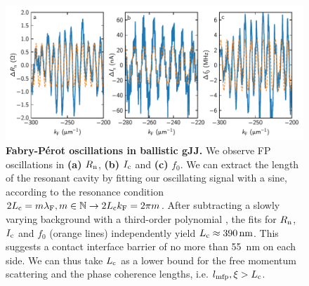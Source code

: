 \documentclass[preprint,
  onecolumn,
  notitlepage,
  amsmath,amssymb,
  aip,
  apl,
]{revtex4-1}
\begin{document}
\begin{figure}[]
    \centering
    \includegraphics[width=\linewidth]{figs/si_fabryperot}
    \caption{{\bf Fabry-P\'erot oscillations in ballistic gJJ.}
        We observe FP oscillations in \textbf{(a)} $R_{\rm n}$, \textbf{(b)} $I_{\rm c}$ and \textbf{(c)} $f_0$.
        We can extract the length of the resonant cavity by fitting our oscillating signal with a sine, according to the resonance condition $2L_{\rm c} = m\lambda_{\rm F}, m\in\mathbb{N} \rightarrow 2L_{\rm c} k_{\rm F} = 2\pi m$.
        After subtracting a slowly varying background with a third-order polynomial \cite{calado_ballistic_2015a}, the fits for $R_{\rm n}$, $I_{\rm c}$ and $f_0$ (orange lines) independently yield $L_{\rm c}\approx \SI{390}{nm}$.
        This suggests a contact interface barrier of no more than \SI{55}{nm} on each side.
        We can thus take $L_{\rm c}$ as a lower bound for the free momentum scattering and the phase coherence lengths, i.e. $l_{\rm mfp},\xi>L_{\rm c}$.        }
    \label{fig:fabry-perot}
\end{figure}
\end{document}
